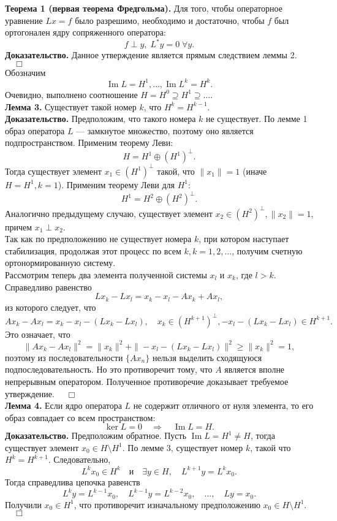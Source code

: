 \documentclass[12pt,a4paper, titlepage]{article}
\renewcommand{\Im}{\mathop{\mathrm{Im}}\nolimits}
\begin{document}
\textbf{Теорема 1 (первая теорема Фредгольма).} Для того, чтобы операторное уравнение $Lx = f$ было разрешимо, необходимо и достаточно, чтобы $f$ был ортогонален ядру сопряженного оператора:
$$
f \perp y, \; L^*y = 0 \; \forall y.
$$
\textbf{Доказательство.} Данное утверждение является прямым следствием леммы 2. $\quad\Box$\\












Обозначим
$$
\Im L = H^1, \ldots, \Im L^k = H^k.
$$
Очевидно, выполнено соотношение $H = H^0 \supseteq H^1 \supseteq \ldots$.\\

\textbf{Лемма 3.} Существует такой номер $k$, что $H^k = H^{k-1}$.\\
\textbf{Доказательство.} Предположим, что такого номера $k$ не существует. По лемме 1 образ оператора $L$ --- замкнутое множество, поэтому оно является подпространством. Применим теорему Леви:
$$
H = H^1 \oplus (H^1)^\perp.
$$
Тогда существует элемент $x_1 \in (H^1)^\perp$ такой, что $\|x_1\| = 1$ (иначе $H = H^1, k = 1$). Применим теорему Леви для $H^1$:
$$
H^1 = H^2 \oplus (H^2)^\perp.
$$
Аналогично предыдущему случаю, существует элемент $x_2 \in (H^2)^\perp, \|x_2\| = 1$, причем $x_1 \perp x_2$. \\

Так как по предположению не существует номера $k$, при котором наступает стабилизация, продолжая этот процесс по всем $k, k = 1, 2, \ldots$, получим счетную ортонормированную систему.\\

Рассмотрим теперь два элемента полученной системы $x_l$ и $x_k$, где $l > k$. Справедливо равенство
$$
Lx_k - Lx_l = x_k - x_l - Ax_k + Ax_l, 
$$ 
из которого следует, что
$$
Ax_k - Ax_l = x_k - x_l - (Lx_k - Lx_l), \quad x_k \in (H^{k+1})^\perp, -x_l - (Lx_k - Lx_l) \in H^{k+1}.
$$
Это означает, что
$$
\|Ax_k - Ax_l\|^2 = \|x_k\|^2 + \|-x_l - (Lx_k - Lx_l)\|^2 \geqslant \|x_k\|^2 = 1,
$$
поэтому из последовательности $\{Ax_n\}$ нельзя выделить сходящуюся подпоследовательность. Но это противоречит тому, что $A$ является вполне непрерывным оператором. Полученное противоречие доказывает требуемое утверждение. $\quad\Box$\\

\textbf{Лемма 4.} Если ядро оператора $L$ не содержит отличного от нуля элемента, то его образ совпадает со всем пространством:
$$
\ker L = 0 \quad \Rightarrow \quad \Im L = H.
$$
\textbf{Доказательство.} Предположим обратное. Пусть $\Im L = H^1 \neq H$, тогда существует элемент $x_0 \in H \setminus H^1$. По лемме 3, существует номер $k$, такой что $H^k = H^{k+1}$. Следовательно,
$$
L^k x_0 \in H^k \quad \text{и} \quad \exists y \in H, \quad L^{k+1}y = L^k x_0.
$$
Тогда справедлива цепочка равенств
$$
L^k y = L^{k-1} x_0, \quad L^{k-1}y = L^{k-2} x_0, \quad \ldots, \quad Ly = x_0.
$$
Получили $x_0 \in H^1$, что противоречит изначальному предположению $x_0 \in H \setminus H^1$. $\quad\Box$\\
\end{document}
